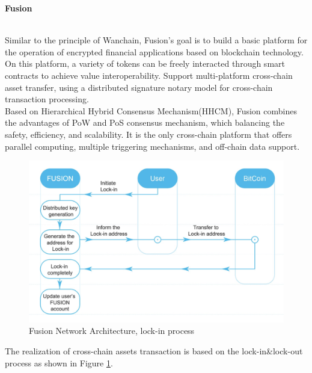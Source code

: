 \begin{large}
\textbf{Fusion}
\end{large}\cite{fusion}\\


\noindent Similar to the principle of Wanchain, Fusion's goal is to build a basic platform for the operation of encrypted financial applications based on blockchain technology. On this platform, a variety of tokens can be freely interacted through smart contracts to achieve value interoperability. Support multi-platform cross-chain asset transfer, using a distributed signature notary model for cross-chain transaction processing.\\

\noindent Based on Hierarchical Hybrid Consensus Mechanism(HHCM), Fusion combines the advantages of PoW and PoS consensus mechanism, which balancing the safety, efficiency, and scalability. It is the only cross-chain platform that offers parallel computing, multiple triggering mechanisms, and off-chain data support.\\

        \begin{figure}[H]
        \includegraphics[width=1\textwidth]{./figures/lockin}
        \centering
        \caption{{Fusion Network Architecture, lock-in process}\protect\footnotemark}
        \centering
        \label{fig:lockin}
        
        \end{figure}
\noindent The realization of cross-chain assets transaction is based on the lock-in\&lock-out process as shown in Figure \ref{fig:lockin}.



